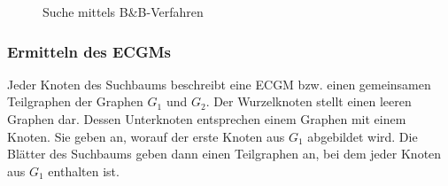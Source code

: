 \begin{figure}[bht]
\centering

\hspace*{\fill} 

\hspace*{\fill} 

\caption{Suche mittels B\&B-Verfahren}
\label{pic:bsp_BnB}
\end{figure}


\subsubsection{Ermitteln des ECGMs}
Jeder Knoten des Suchbaums beschreibt eine ECGM bzw. einen gemeinsamen 
Teilgraphen der Graphen $G_1$ und $G_2$. Der Wurzelknoten stellt einen 
leeren Graphen dar. Dessen Unterknoten entsprechen einem Graphen mit 
einem Knoten. Sie geben an, worauf der erste Knoten aus $G_1$ 
abgebildet wird. Die Blätter des Suchbaums geben dann einen Teilgraphen 
an, bei dem jeder Knoten aus $G_1$ enthalten ist. 

